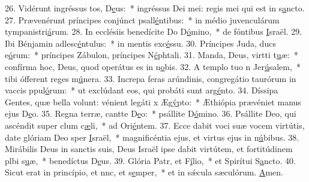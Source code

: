 26. Vidérunt ingréssus tos, D\uline{e}us:~* ingréssus Dei mei: regis mei qui est in s\uline{a}ncto.
27. Prævenérunt príncipes conjúnct psall\uline{é}ntibus:~* in médio juvenculárum tympanistri\uline{á}rum.
28. In ecclésiis benedícite Do D\uline{ó}mino,~* de fóntibus \uline{I}sraël.
29. Ibi Bénjamin adlesc\uline{é}ntulus:~* in mentis exc\uline{é}ssu.
30. Príncipes Juda, ducs e\uline{ó}rum:~* príncipes Zábulon, príncipes N\uline{é}phtali.
31. Manda, Deus, virtti t\uline{u}æ:~* confírma hoc, Deus, quod operátus es in n\uline{o}bis.
32. A templo tuo n Jer\uline{ú}salem,~* tibi ófferent reges m\uline{ú}nera.
33. Increpa feras arúndinis, congregátio taurórum in vaccis ppul\uline{ó}rum:~* ut exclúdant eos, qui probáti sunt arg\uline{é}nto.
34. Díssipa Gentes, quæ bella volunt: vénient legáti x Æg\uline{ý}pto:~* Æthiópia prævéniet manus ejus D\uline{e}o.
35. Regna terræ, cantte D\uline{e}o:~* psállite D\uline{ó}mino.
36. Psállite Deo, qui ascéndit super clum c\uline{æ}li,~* ad Ori\uline{é}ntem.
37. Ecce dabit voci suæ vocem virtútis, date glóriam Deo sper \uline{I}sraël,~* magnificéntia ejus, et virtus ejus in n\uline{ú}bibus.
38. Mirábilis Deus in sanctis suis, Deus Israël ipse dabit virtútem, et fortitúdinem plbi s\uline{u}æ,~* benedíctus D\uline{e}us.
39. Glória Patr, et F\uline{í}lio,~* et Spirítui S\uline{a}ncto.
40. Sicut erat in princípio, et nnc, et s\uline{e}mper,~* et in sǽcula sæculórum. \uline{A}men.
